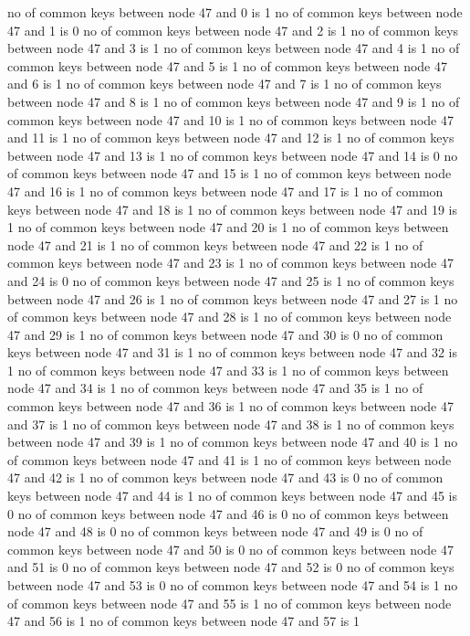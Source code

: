 no of common keys between node 47 and 0 is 1
no of common keys between node 47 and 1 is 0
no of common keys between node 47 and 2 is 1
no of common keys between node 47 and 3 is 1
no of common keys between node 47 and 4 is 1
no of common keys between node 47 and 5 is 1
no of common keys between node 47 and 6 is 1
no of common keys between node 47 and 7 is 1
no of common keys between node 47 and 8 is 1
no of common keys between node 47 and 9 is 1
no of common keys between node 47 and 10 is 1
no of common keys between node 47 and 11 is 1
no of common keys between node 47 and 12 is 1
no of common keys between node 47 and 13 is 1
no of common keys between node 47 and 14 is 0
no of common keys between node 47 and 15 is 1
no of common keys between node 47 and 16 is 1
no of common keys between node 47 and 17 is 1
no of common keys between node 47 and 18 is 1
no of common keys between node 47 and 19 is 1
no of common keys between node 47 and 20 is 1
no of common keys between node 47 and 21 is 1
no of common keys between node 47 and 22 is 1
no of common keys between node 47 and 23 is 1
no of common keys between node 47 and 24 is 0
no of common keys between node 47 and 25 is 1
no of common keys between node 47 and 26 is 1
no of common keys between node 47 and 27 is 1
no of common keys between node 47 and 28 is 1
no of common keys between node 47 and 29 is 1
no of common keys between node 47 and 30 is 0
no of common keys between node 47 and 31 is 1
no of common keys between node 47 and 32 is 1
no of common keys between node 47 and 33 is 1
no of common keys between node 47 and 34 is 1
no of common keys between node 47 and 35 is 1
no of common keys between node 47 and 36 is 1
no of common keys between node 47 and 37 is 1
no of common keys between node 47 and 38 is 1
no of common keys between node 47 and 39 is 1
no of common keys between node 47 and 40 is 1
no of common keys between node 47 and 41 is 1
no of common keys between node 47 and 42 is 1
no of common keys between node 47 and 43 is 0
no of common keys between node 47 and 44 is 1
no of common keys between node 47 and 45 is 0
no of common keys between node 47 and 46 is 0
no of common keys between node 47 and 48 is 0
no of common keys between node 47 and 49 is 0
no of common keys between node 47 and 50 is 0
no of common keys between node 47 and 51 is 0
no of common keys between node 47 and 52 is 0
no of common keys between node 47 and 53 is 0
no of common keys between node 47 and 54 is 1
no of common keys between node 47 and 55 is 1
no of common keys between node 47 and 56 is 1
no of common keys between node 47 and 57 is 1
